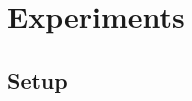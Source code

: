 \documentclass{llmxive}
\providecommand{\methodtitle}{EfficientRollout}
\providecommand{\mal}{\tau}
\providecommand{\SDToggle}{\pi_{\mathrm{SD}}}
\providecommand{\SDOn}{\texttt{sd\_on}}
\providecommand{\mj}[1]{}
\begin{document}



\section{Experiments}
\label{sec:Evaluation}

\subsection{Setup}
\label{sec:eval-setting}
\end{document}
